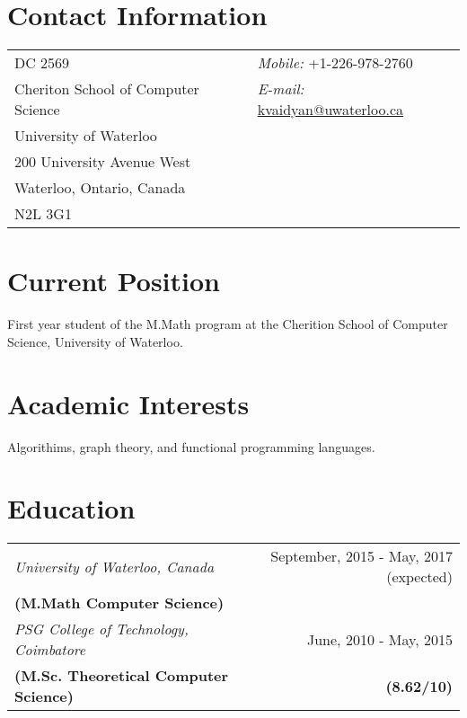 \documentclass[margin,line]{res}
\begin{document}

\begin{resume}
\section{\sc Contact Information}
\vspace{.05in}
\begin{tabular}{l l}
DC 2569				    & {\it Mobile:} +1-226-978-2760\\ 
Cheriton School of Computer Science  & {\it E-mail:}  \href{mailto:kvaidyan@uwaterloo.ca}{kvaidyan@uwaterloo.ca}\\    
University of Waterloo	             & \\
200 University Avenue West           & \\
Waterloo, Ontario, Canada	         & \\
N2L 3G1     
\end{tabular}

\section{\sc Current Position}
First year student of the M.Math program at the Cherition School of Computer Science, University
of Waterloo.

\section{\sc Academic Interests}
Algorithims, graph theory, and functional programming languages.

\section{\sc Education}
\begin{tabular}{l r}
\textit{University of Waterloo, Canada} & September, 2015 - May, 2017 (expected)\\
\textbf{(M.Math Computer Science)} & \\ 
\textit{PSG College of Technology, Coimbatore} & June, 2010 - May, 2015 \\
\textbf{(M.Sc. Theoretical Computer Science)} & \textbf{(8.62/10)}\\
\end{tabular}


\end{resume}
\end{document}
